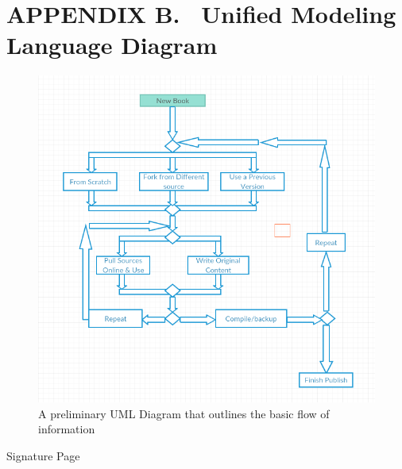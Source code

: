 \documentclass[letterpaper, 10pt, draftclsnofoot, compsoc, onecolumn]{IEEEtran}
\begin{document}
{{\clearpage
\section[APPENDIX B. \ UML Diagram]{\rmfamily\bfseries\color{black}
APPENDIX B. \ Unified Modeling Language Diagram}

\bigskip


\begin{figure}[ht!]
\centering
\includegraphics[width=150mm]{usage_diagram.png}
\caption{A preliminary UML Diagram that outlines the basic flow of information}
\end{figure}

\bigskip

\newpage



\newpage
\centerline{\sc \large Signature Page}
\vspace{5pc}


\centering

}}
\end{document}
